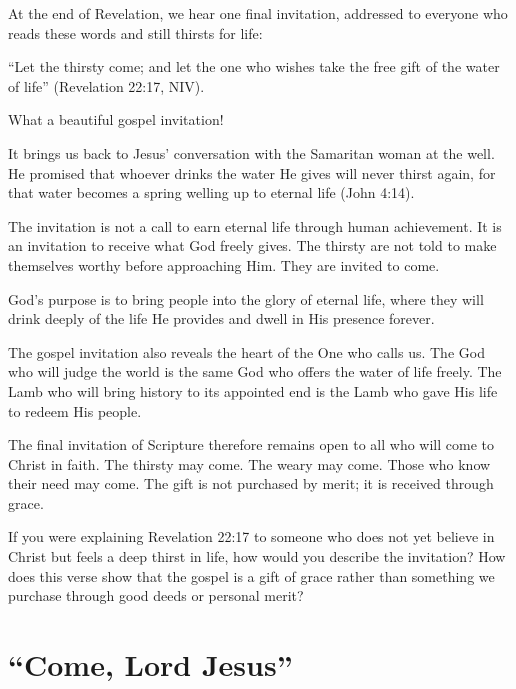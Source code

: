 At the end of Revelation, we hear one final invitation, addressed to everyone who reads these words and still thirsts for life:

``Let the thirsty come; and let the one who wishes take the free gift of the water of life'' (Revelation 22:17, NIV).

What a beautiful gospel invitation!

It brings us back to Jesus' conversation with the Samaritan woman at the well. He promised that whoever drinks the water He gives will never thirst again, for that water becomes a spring welling up to eternal life (John 4:14).

The invitation is not a call to earn eternal life through human achievement. It is an invitation to receive what God freely gives. The thirsty are not told to make themselves worthy before approaching Him. They are invited to come.

God's purpose is to bring people into the glory of eternal life, where they will drink deeply of the life He provides and dwell in His presence forever.

The gospel invitation also reveals the heart of the One who calls us. The God who will judge the world is the same God who offers the water of life freely. The Lamb who will bring history to its appointed end is the Lamb who gave His life to redeem His people.

The final invitation of Scripture therefore remains open to all who will come to Christ in faith. The thirsty may come. The weary may come. Those who know their need may come. The gift is not purchased by merit; it is received through grace.

\begin{ReaderQuestion}
If you were explaining Revelation 22:17 to someone who does not yet believe in Christ but feels a deep thirst in life, how would you describe the invitation? How does this verse show that the gospel is a gift of grace rather than something we purchase through good deeds or personal merit?
\end{ReaderQuestion}

\section{``Come, Lord Jesus''}

